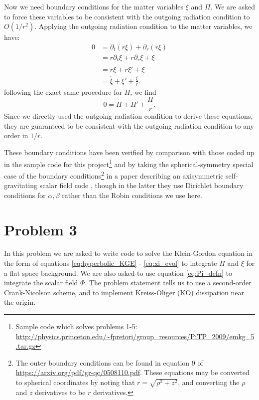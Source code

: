 \documentclass[12pt]{article}
\numberwithin{equation}{section}
\begin{document}
Now we need boundary conditions for the matter variables $\xi$ and $\Pi$.  We are asked to force these variables to be consistent with the outgoing radiation condition to $O(1/r^2)$.  Applying the outgoing radiation condition to the matter variables, we have:
\begin{equation}
\begin{aligned}
0 &= \partial_t (r \xi) + \partial_r (r \xi) \\
&= r \partial_t \xi + r \partial_r \xi + \xi \\
&= r \dot{\xi} + r \xi' + \xi \\
&= \dot{\xi} + \xi' + \frac{\xi}{r}.
\end{aligned}
\end{equation}
following the exact same procedure for $\Pi$, we find
\begin{equation}
0 = \dot{\Pi} + \Pi' + \frac{\Pi}{r}.
\end{equation}
Since we directly used the outgoing radiation condition to derive these equations, they are guaranteed to be consistent with the outgoing radiation condition to any order in $1/r$.

These boundary conditions have been verified by comparison with those coded up in the sample code for this project\footnote{Sample code which solves problems 1-5: \url{http://physics.princeton.edu/~fpretori/group_resources/PiTP_2009/emkg_5.tar.gz}} and by taking the spherical-symmetry special case of the boundary conditions\footnote{The outer boundary conditions can be found in equation 9 of \url{https://arxiv.org/pdf/gr-qc/0508110.pdf}.  These equations may be converted to spherical coordinates by noting that $r = \sqrt{\rho^2 + z^2}$, and converting the $\rho$ and $z$ derivatives to be $r$ derivatives.} in a paper describing an axisymmetric self-gravitating scalar field code \cite{Pretorius06}, though in the latter they use Dirichlet boundary conditions for $\alpha, \beta$ rather than the Robin conditions we use here.

\section{Problem 3}
In this problem we are asked to write code to solve the Klein-Gordon equation in the form of equations \ref{eq:hyperbolic_KGE} - \ref{eq:xi_evol} to integrate $\Pi$ and $\xi$ for a flat space background.  We are also asked to use equation \ref{eq:Pi_defn} to integrate the scalar field $\Phi$.  The problem statement tells us to use a second-order Crank-Nicolson scheme, and to implement Kreiss-Oliger (KO) dissipation near the origin.
\end{document}
